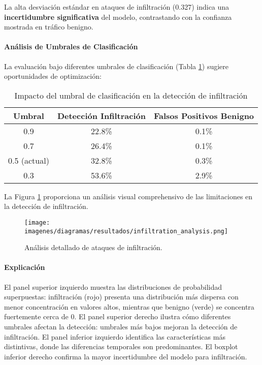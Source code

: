La alta desviación estándar en ataques de infiltración (0.327) indica una \textbf{incertidumbre significativa} del modelo, contrastando con la confianza mostrada en tráfico benigno.

\paragraph{Análisis de Umbrales de Clasificación}

La evaluación bajo diferentes umbrales de clasificación (Tabla \ref{tab:threshold_analysis}) sugiere oportunidades de optimización:

\begin{table}[H]
\centering
\begin{tabular}{ccc}
\toprule
\textbf{Umbral} & \textbf{Detección Infiltración} & \textbf{Falsos Positivos Benigno} \\
\midrule
0.9 & 22.8\% & 0.1\% \\
0.7 & 26.4\% & 0.1\% \\
0.5 (actual) & 32.8\% & 0.3\% \\
0.3 & 53.6\% & 2.9\% \\
\bottomrule
\end{tabular}
\caption{Impacto del umbral de clasificación en la detección de infiltración}
\label{tab:threshold_analysis}
\end{table}

La Figura \ref{fig:infiltration_analysis} proporciona un análisis visual comprehensivo de las limitaciones en la detección de infiltración.

\begin{figure}[H]
\centering
\texttt{[image: imagenes/diagramas/resultados/infiltration\_analysis.png]}
\caption{Análisis detallado de ataques de infiltración.}
\label{fig:infiltration_analysis}
\end{figure}

\paragraph{Explicación}
El panel superior izquierdo muestra las distribuciones de probabilidad superpuestas: infiltración (rojo) presenta una distribución más dispersa con menor concentración en valores altos, mientras que benigno (verde) se concentra fuertemente cerca de 0. El panel superior derecho ilustra cómo diferentes umbrales afectan la detección: umbrales más bajos mejoran la detección de infiltración. El panel inferior izquierdo identifica las características más distintivas, donde las diferencias temporales son predominantes. El boxplot inferior derecho confirma la mayor incertidumbre del modelo para infiltración.

